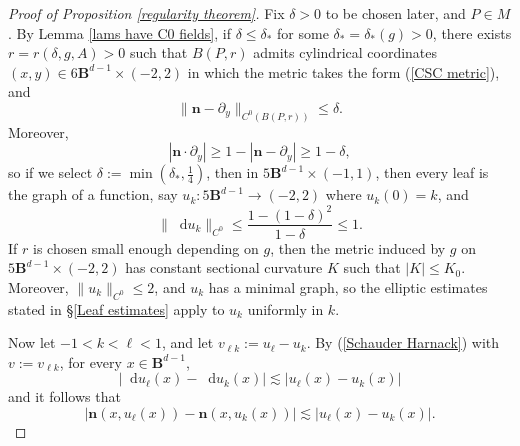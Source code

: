 \documentclass[reqno,11pt]{amsart}
\newcommand{\Ball}{\mathbf{B}}
\newcommand*\dif{\mathop{}\!\mathrm{d}}
\newcommand{\normal}{\mathbf n}
\theoremstyle{definition}
\numberwithin{equation}{section}
\begin{document}
\begin{proof}[Proof of Proposition \ref{regularity theorem}]
Fix $\delta > 0$ to be chosen later, and $P \in M$.
By Lemma \ref{lams have C0 fields}, if $\delta \leq \delta_*$ for some $\delta_* = \delta_*(g) > 0$, there exists $r = r(\delta, g, A) > 0$ such that $B(P, r)$ admits cylindrical coordinates $(x, y) \in 6\Ball^{d - 1} \times (-2, 2)$ in which the metric takes the form (\ref{CSC metric}), and
\begin{equation}\label{normal is almost constant}
\|\normal - \partial_y\|_{C^0(B(P, r))} \leq \delta.
\end{equation}
Moreover,
$$|\normal \cdot \partial_y| \geq 1 - |\normal - \partial_y| \geq 1 - \delta,$$
so if we select $\delta := \min(\delta_*, \frac{1}{4})$, then in $5\Ball^{d - 1} \times (-1, 1)$, then every leaf is the graph of a function, say $u_k: 5\Ball^{d - 1} \to (-2, 2)$ where $u_k(0) = k$, and
$$\|\dif u_k\|_{C^0} \leq \frac{1 - (1 - \delta)^2}{1 - \delta} \leq 1.$$
If $r$ is chosen small enough depending on $g$, then the metric induced by $g$ on $5\Ball^{d - 1} \times (-2, 2)$ has constant sectional curvature $K$ such that $|K| \leq K_0$.
Moreover, $\|u_k\|_{C^0} \leq 2$, and $u_k$ has a minimal graph, so the elliptic estimates stated in \S\ref{Leaf estimates} apply to $u_k$ uniformly in $k$.

Now let $-1 < k < \ell < 1$, and let $v_{\ell k} := u_\ell - u_k$.
By (\ref{Schauder Harnack}) with $v := v_{\ell k}$, for every $x \in \Ball^{d - 1}$,
\begin{equation}\label{bound on du}
|\dif u_\ell(x) - \dif u_k(x)| \lesssim |u_\ell(x) - u_k(x)|
\end{equation}
and it follows that
\begin{equation}\label{vertical Lipschitz}
|\normal(x, u_\ell(x)) - \normal(x, u_k(x))| \lesssim |u_\ell(x) - u_k(x)|.
\end{equation}


\end{proof}
\end{document}

